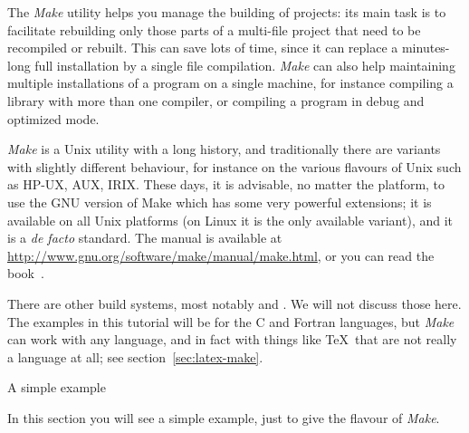 

The \emph{Make} utility helps you manage the building of
projects: its main task is to facilitate rebuilding only those parts 
of a multi-file project that need to be recompiled or rebuilt.
This can save lots of time, since it
can replace a minutes-long full installation by a single file
compilation. \emph{Make} can also help maintaining multiple
installations of a program on a single machine, for instance compiling
a library with more than one compiler, or compiling a program in debug
and optimized mode.

\emph{Make} is a Unix utility with a long history, and traditionally
there are variants with slightly different behaviour, 
for instance on the various
flavours of Unix such as HP-UX, AUX, IRIX. 
These days, it is advisable, no
matter the platform, to use the GNU version of Make which has some
very powerful extensions; it is available on all Unix platforms
(on Linux it is the only available variant), and it is a {\it de
  facto} standard. The manual is available at
\url{http://www.gnu.org/software/make/manual/make.html}, or you can
read the book~\cite{OReilly-GnuMake}.

There are other build systems, most notably  and
. We will not discuss those here. The examples in this
tutorial will be for the C and Fortran languages, but \emph{Make} can
work with any language, and in fact with things like \TeX\ that are
not really a language at all; see section~\ref{sec:latex-make}.

 {A simple example}

\begin{purpose}
In this section you will see a simple example, just to give the flavour of
\emph{Make}.
\end{purpose}

